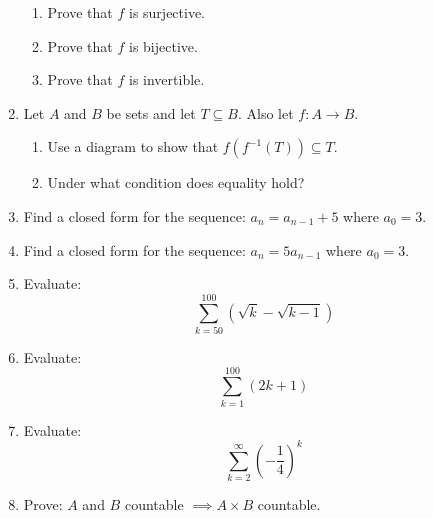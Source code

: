 \documentclass[letterpaper,12pt,fleqn]{article}
\begin{document}
\begin{enumerate}[left=0pt]
\begin{enumerate}
  \item Prove that \(f\) is surjective.

    \vspace{3in}

  \item Prove that \(f\) is bijective.

    \vspace{1in}

  \item Prove that \(f\) is invertible.
  \end{enumerate}

  \newpage

\item Let \(A\) and \(B\) be sets and let \(T\subseteq B\).  Also let \(f:A\to B\).
  \begin{enumerate}
  \item Use a diagram to show that \(f(f^{-1}(T))\subseteq T\).

    \vspace{5in}

  \item Under what condition does equality hold?
  \end{enumerate}

  \newpage

\item Find a closed form for the sequence: \(a_n=a_{n-1}+5\) where \(a_0=3\).

  \vspace{2in}

\item Find a closed form for the sequence: \(a_n=5a_{n-1}\) where \(a_0=3\).

  \vspace{2in}

\item Evaluate:
  \[\sum_{k=50}^{100}(\sqrt{k}-\sqrt{k-1})\]

  \newpage

\item Evaluate:
  \[\sum_{k=1}^{100}(2k+1)\]

  \vspace{4in}

\item Evaluate:
  \[\sum_{k=2}^{\infty}\left(-\frac{1}{4}\right)^k\]

  \newpage

\item Prove: \(A\) and \(B\) countable \(\implies A\times B\) countable.

\end{enumerate}
\end{document}

